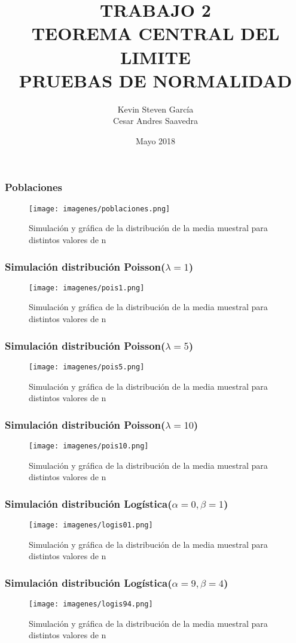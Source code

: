 \documentclass[12pt]{beamer}
\author{Kevin Steven García \\ Cesar Andres Saavedra}
\title{TRABAJO 2 \\ TEOREMA CENTRAL DEL LIMITE \\ PRUEBAS DE NORMALIDAD}
\institute{Universidad del Valle \\ Estadística \\ Simulación Estadística}
\date{Mayo 2018}
\begin{document}
\begin{frame}
\titlepage
\end{frame}


\begin{frame}
\frametitle{Poblaciones}
\begin{figure}
\centering
\texttt{[image: imagenes/poblaciones.png]}
\caption{Simulación y gráfica de la distribución de la media muestral para distintos valores de n}\label{figura2}
\end{figure}
\end{frame}

\begin{frame}
\frametitle{Simulación distribución Poisson($\lambda=1$) }
\begin{figure}
\centering
\texttt{[image: imagenes/pois1.png]}
\caption{Simulación y gráfica de la distribución de la media muestral para distintos valores de n}\label{figura2}
\end{figure}
\end{frame}

\begin{frame}
\frametitle{Simulación distribución Poisson($\lambda=5$) }
\begin{figure}
\centering
\texttt{[image: imagenes/pois5.png]}
\caption{Simulación y gráfica de la distribución de la media muestral para distintos valores de n}\label{figura2}
\end{figure}
\end{frame}

\begin{frame}
\frametitle{Simulación distribución Poisson($\lambda=10$) }
\begin{figure}
\centering
\texttt{[image: imagenes/pois10.png]}
\caption{Simulación y gráfica de la distribución de la media muestral para distintos valores de n}\label{figura2}
\end{figure}
\end{frame}

\begin{frame}
\frametitle{Simulación distribución Logística($\alpha=0,\beta=1$) }
\begin{figure}
\centering
\texttt{[image: imagenes/logis01.png]}
\caption{Simulación y gráfica de la distribución de la media muestral para distintos valores de n}\label{figura2}
\end{figure}
\end{frame}

\begin{frame}
\frametitle{Simulación distribución Logística($\alpha=9,\beta=4$) }
\begin{figure}
\centering
\texttt{[image: imagenes/logis94.png]}
\caption{Simulación y gráfica de la distribución de la media muestral para distintos valores de n}\label{figura2}
\end{figure}
\end{frame}
\end{document}
